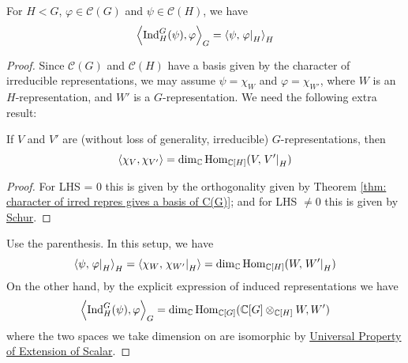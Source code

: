 \begin{theorem}\label{thm: Frobenius Reciprocity}
    For $H < G$, $\varphi \in \mathcal{C}(G)$ and $\psi \in \mathcal{C}(H)$, we have
    \[
        \left\langle \mathrm{Ind}_H^G(\psi), \varphi \right\rangle_G = \left\langle \psi, \left.\varphi\right|_{H} \right\rangle_H
    \]
\end{theorem}

\begin{proof}
    Since $\mathcal{C}(G)$ and $\mathcal{C}(H)$ have a basis given by the character of irreducible representations, we may assume $\psi = \chi_W$ and $\varphi = \chi_{W'}$, where $W$ is an $H$-representation, and $W'$ is a $G$-representation. We need the following extra result:

    \begin{parenthesis}
        If $V$ and $V'$ are (without loss of generality, irreducible) $G$-representations, then
        \[
            \left\langle \chi_V, \chi_{V'} \right\rangle = \dim_{\mathbb{C}} \mathrm{Hom}_{\mathbb{C}[H]} (V, \left.V'\right|_{H})
        \]
    \end{parenthesis}

    \begin{proof}
        For LHS = 0 this is given by the orthogonality given by Theorem \ref{thm: character of irred repres gives a basis of C(G)}; and for LHS $\neq 0$ this is given by \hyperref[lem: Schur]{Schur}.
    \end{proof}

    Use the parenthesis. In this setup, we have
    \[
        \left\langle \psi, \left.\varphi\right|_{H} \right\rangle_H = \left\langle \chi_{W}, \left.\chi_{W'}\right|_{H} \right\rangle = \dim_{\mathbb{C}} \mathrm{Hom}_{\mathbb{C}[H]} (W, \left.W'\right|_{H})
    \]
    On the other hand, by the explicit expression of induced representations we have
    \[
        \left\langle \mathrm{Ind}_H^G(\psi), \varphi \right\rangle_G = \dim_{\mathbb{C}} \mathrm{Hom}_{\mathbb{C}[G]} (\mathbb{C}[G] \otimes_{\mathbb{C}[H]} W, W')
    \]
    where the two spaces we take dimension on are isomorphic by \hyperref[prop: Universal Property of Extension of Scalar]{Universal Property of Extension of Scalar}.
\end{proof}


